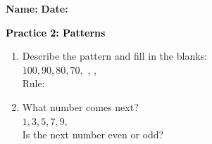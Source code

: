 \documentclass[12pt, letterpaper, fleqn]{article}
\newcommand{\blank}{\underline{\hspace{2.2cm}}}
\newcommand{\blanklong}{\underline{\hspace{6.5cm}}}
\begin{document}
\textbf{Name:} \underline{\hspace{5cm}}
\hfill
\textbf{Date:} \underline{\hspace{3cm}}\\

\begin{tcolorbox}[colback=customteal!20]
    \large\textcolor{black}{\textbf{Practice 2: Patterns}}
\end{tcolorbox}

\vspace{5mm}
\begin{enumerate}[itemsep=2.5cm, leftmargin=0.6cm]
\item Describe the pattern and fill in the blanks:
\\
$100, 90, 80, 70,$ \blank, \blank, \blank \\
Rule: \blanklong

\item What number comes next?
\\
$1, 3, 5, 7, 9,$ \blank \\
Is the next number even or odd? \blank
\end{enumerate}
\end{document}
